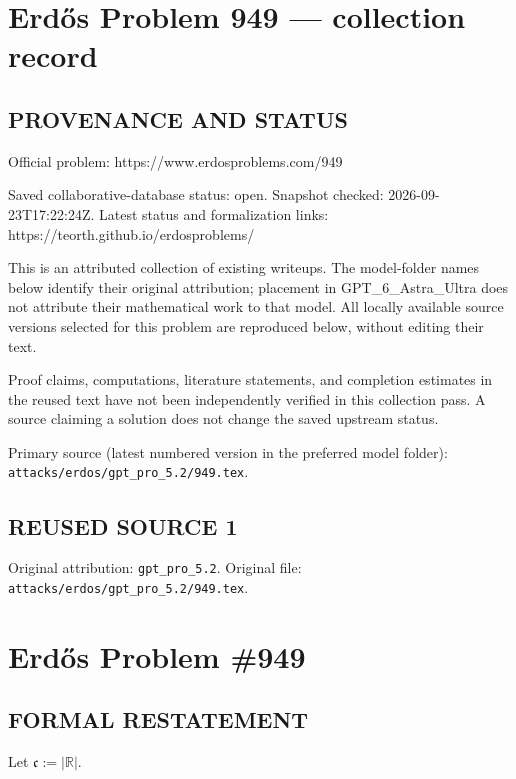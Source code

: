 \section*{Erd\H{o}s Problem 949 --- collection record}

\subsection*{PROVENANCE AND STATUS}
Official problem: https://www.erdosproblems.com/949

Saved collaborative-database status: open.
Snapshot checked: 2026-09-23T17:22:24Z.
Latest status and formalization links: https://teorth.github.io/erdosproblems/

This is an attributed collection of existing writeups. The model-folder names below identify their original attribution; placement in GPT\_6\_Astra\_Ultra does not attribute their mathematical work to that model. All locally available source versions selected for this problem are reproduced below, without editing their text.

Proof claims, computations, literature statements, and completion estimates in the reused text have not been independently verified in this collection pass. A source claiming a solution does not change the saved upstream status.

Primary source (latest numbered version in the preferred model folder): \texttt{attacks/erdos/gpt\_pro\_5.2/949.tex}.

\subsection*{REUSED SOURCE 1}
Original attribution: \texttt{gpt\_pro\_5.2}.
Original file: \texttt{attacks/erdos/gpt\_pro\_5.2/949.tex}.


\section*{Erd\H{o}s Problem \#949}

\subsection*{FORMAL RESTATEMENT}
Let $\mathfrak c:=|\mathbb R|$.


